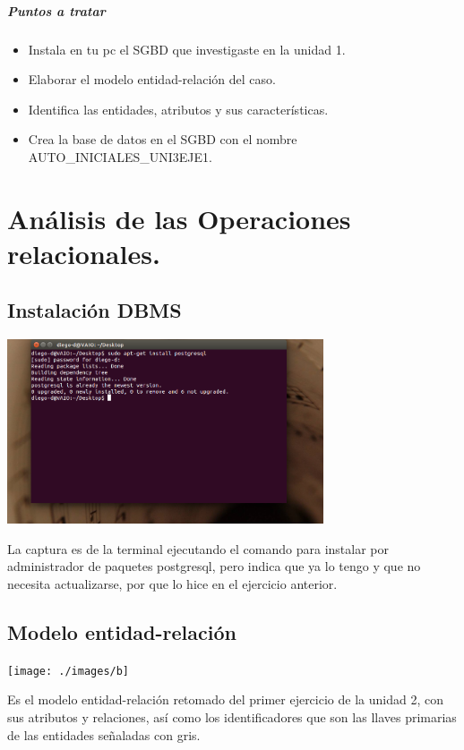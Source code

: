 \documentclass[spanish,12pt,letterpapper]{article}
\begin{document}
	\subparagraph{Puntos a tratar}
	\begin{itemize}
	\item Instala en tu pc el SGBD que investigaste en la unidad 1.
	\item Elaborar el modelo entidad-relación del caso.
	\item Identifica las entidades, atributos y sus características.
	\item Crea la base de datos en el SGBD con el nombre AUTO\_INICIALES\_UNI3EJE1.
	\end{itemize}
	
	\section{Análisis de las Operaciones relacionales.}
	\subsection{Instalación DBMS}
	\begin{center}
	\includegraphics[width=0.7\textwidth]{./images/a}~\\[1cm]
	\end{center}
	
	La captura es de la terminal ejecutando el comando para instalar por administrador de paquetes postgresql, pero indica que ya lo tengo y que no necesita actualizarse, por que lo hice en el ejercicio anterior.
    	
	\subsection{Modelo entidad-relación}
	\begin{center}
	\texttt{[image: ./images/b]}~\\[1cm]
	\end{center}
	
	Es el modelo entidad-relación retomado del primer ejercicio de la unidad 2, con sus atributos y relaciones, así como los identificadores que son las llaves primarias de las entidades señaladas con gris.
	
\end{document}
